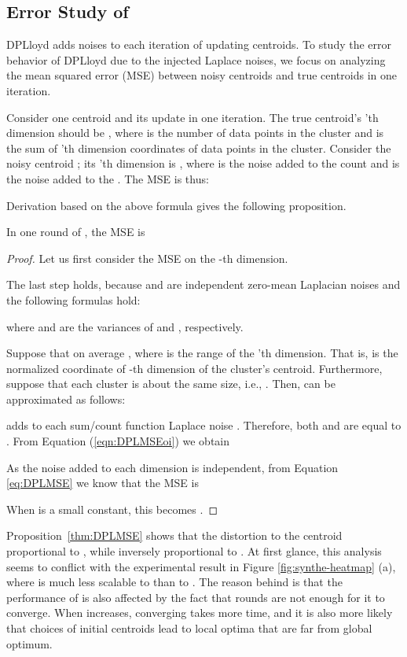 \subsection{Error Study of \dpl}\label{sec:dpl_Analysis}

DPLloyd adds noises to each iteration of updating centroids.  To study the error behavior of DPLloyd due to the injected Laplace noises, we focus on analyzing the mean squared error (MSE) between noisy centroids and true centroids in one iteration.  


Consider one centroid and its update in one iteration.  The true centroid's 'th dimension should be , where  is the number of data points in the cluster and  is the sum of 'th dimension coordinates of data points in the cluster.  Consider the noisy centroid ; its 'th dimension is , where  is the noise added to the count and  is the noise added to the .  The MSE is thus:




Derivation based on the above formula gives the following proposition.

\begin{proposition}\label{thm:DPLMSE}
In one round of \dpl, the MSE is

\end{proposition}

\begin{proof}
Let us first consider the MSE on the -th dimension.

The last step holds, because  and  are independent zero-mean Laplacian noises and the following formulas hold:

where  and  are the variances of  and , respectively. 

Suppose that on average , where  is the range of the 'th dimension. That is,  is the normalized coordinate of -th dimension of the cluster's centroid. Furthermore, suppose that each cluster is about the same size, i.e., . Then,  can be approximated as follows:

\dpl adds to each sum/count function Laplace noise . Therefore, both  and  are equal to . From Equation (\ref{eqn:DPLMSEoi}) we obtain

As the noise added to each dimension is independent, from Equation \ref{eq:DPLMSE} we know that the MSE is

When  is a small constant, this becomes .
\end{proof}

Proposition~\ref{thm:DPLMSE} shows that the distortion to the centroid proportional to , while  inversely proportional to . At first glance, this analysis seems to conflict with the experimental result in Figure \ref{fig:synthe-heatmap} (a), where \dpl is much less scalable to  than to . The reason behind is that the performance of \dpl is also affected by the fact that  rounds are not enough for it to converge.  When  increases, converging takes more time, and it is also more likely that choices of initial centroids lead to local optima that are far from global optimum. 
 




